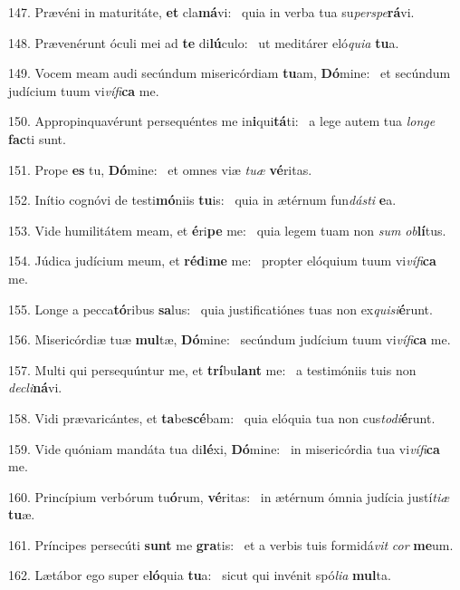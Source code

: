 147. Prævéni in maturitáte, \textbf{et} cla\textbf{má}vi: \ast\  quia in verba tua su\textit{per}\textit{spe}\textbf{rá}vi.\

148. Prævenérunt óculi mei ad \textbf{te} di\textbf{lú}culo: \ast\  ut meditárer eló\textit{qui}\textit{a} \textbf{tu}a.\

149. Vocem meam audi secúndum misericórdiam \textbf{tu}am, \textbf{Dó}mine: \ast\  et secúndum judícium tuum vi\textit{ví}\textit{fi}\textbf{ca} me.\

150. Appropinquavérunt persequéntes me in\textbf{i}qui\textbf{tá}ti: \ast\  a lege autem tua \textit{lon}\textit{ge} \textbf{fac}ti sunt.\

151. Prope \textbf{es} tu, \textbf{Dó}mine: \ast\  et omnes viæ \textit{tu}\textit{æ} \textbf{vé}ritas.\

152. Inítio cognóvi de testi\textbf{mó}niis \textbf{tu}is: \ast\  quia in ætérnum fun\textit{dás}\textit{ti} \textbf{e}a.\

153. Vide humilitátem meam, et \textbf{é}ri\textbf{pe} me: \ast\  quia legem tuam non \textit{sum} \textit{ob}\textbf{lí}tus.\

154. Júdica judícium meum, et \textbf{réd}i\textbf{me} me: \ast\  propter elóquium tuum vi\textit{ví}\textit{fi}\textbf{ca} me.\

155. Longe a pecca\textbf{tó}ribus \textbf{sa}lus: \ast\  quia justificatiónes tuas non ex\textit{qui}\textit{si}\textbf{é}runt.\

156. Misericórdiæ tuæ \textbf{mul}tæ, \textbf{Dó}mine: \ast\  secúndum judícium tuum vi\textit{ví}\textit{fi}\textbf{ca} me.\

157. Multi qui persequúntur me, et \textbf{trí}bu\textbf{lant} me: \ast\  a testimóniis tuis non \textit{de}\textit{cli}\textbf{ná}vi.\

158. Vidi prævaricántes, et \textbf{ta}be\textbf{scé}bam: \ast\  quia elóquia tua non cus\textit{to}\textit{di}\textbf{é}runt.\

159. Vide quóniam mandáta tua di\textbf{lé}xi, \textbf{Dó}mine: \ast\  in misericórdia tua vi\textit{ví}\textit{fi}\textbf{ca} me.\

160. Princípium verbórum tu\textbf{ó}rum, \textbf{vé}ritas: \ast\  in ætérnum ómnia judícia justí\textit{ti}\textit{æ} \textbf{tu}æ.\

161. Príncipes persecúti \textbf{sunt} me \textbf{gra}tis: \ast\  et a verbis tuis formidá\textit{vit} \textit{cor} \textbf{me}um.\

162. Lætábor ego super e\textbf{ló}quia \textbf{tu}a: \ast\  sicut qui invénit spó\textit{li}\textit{a} \textbf{mul}ta.\

